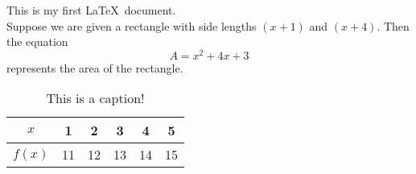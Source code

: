 \documentclass[11pt]{article}
\begin{document}
This is my first \LaTeX\ document.\\
Suppose we are given a rectangle with side lengths $(x+1)$ and $(x+4)$. Then the equation $$A=x^2+4x+3$$ represents the area of the rectangle.\\
\begin{table}[H]
\centering
\def\arraystretch{1.5}
\begin{tabular}{|c|c|c|c|c|c|}
\hline
$x$&1&2&3&4&5\\ \hline
$f(x)$&11&12&13&14&15\\ \hline
\end{tabular}
\caption{This is a caption!}
\end{table}
\end{document}
